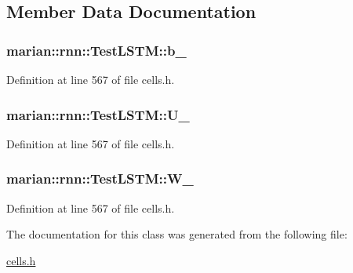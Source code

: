 \subsection{Member Data Documentation}
\subsubsection[{\texorpdfstring{b\+\_\+}{b_}}]{ marian\+::rnn\+::\+Test\+L\+S\+T\+M\+::b\+\_\+\hspace{0.3cm}{\ttfamily [private]}}\hypertarget{classmarian_1_1rnn_1_1TestLSTM_a42841212d517619b37559870c0d65ed1}{}\label{classmarian_1_1rnn_1_1TestLSTM_a42841212d517619b37559870c0d65ed1}


Definition at line 567 of file cells.\+h.

\subsubsection[{\texorpdfstring{U\+\_\+}{U_}}]{ marian\+::rnn\+::\+Test\+L\+S\+T\+M\+::\+U\+\_\+\hspace{0.3cm}{\ttfamily [private]}}\hypertarget{classmarian_1_1rnn_1_1TestLSTM_aea81b51a3f0af12142e2f805d2dfb98b}{}\label{classmarian_1_1rnn_1_1TestLSTM_aea81b51a3f0af12142e2f805d2dfb98b}


Definition at line 567 of file cells.\+h.

\subsubsection[{\texorpdfstring{W\+\_\+}{W_}}]{ marian\+::rnn\+::\+Test\+L\+S\+T\+M\+::\+W\+\_\+\hspace{0.3cm}{\ttfamily [private]}}\hypertarget{classmarian_1_1rnn_1_1TestLSTM_a42bf53d25a767f033fd0e24309d22c2a}{}\label{classmarian_1_1rnn_1_1TestLSTM_a42bf53d25a767f033fd0e24309d22c2a}


Definition at line 567 of file cells.\+h.



The documentation for this class was generated from the following file\+:\begin{DoxyCompactItemize}
\item 
\hyperlink{cells_8h}{cells.\+h}\end{DoxyCompactItemize}
